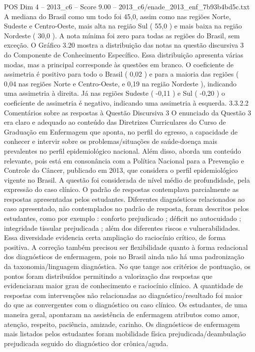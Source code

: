 \begin{textsample}{POS Dim 4 – 2013\_c6 – Score 9.00 – 2013\_c6/enade\_2013\_enf\_7b93b4bd5c.txt}
A mediana do Brasil como um todo foi 45,0, assim como nas regiões Norte, Sudeste e Centro-Oeste, mais alta na região Sul ( 55,0 ) e mais baixa na região Nordeste ( 30,0 ).
A nota mínima foi zero para todas as regiões do Brasil, sem exceção.
O Gráfico 3.20 mostra a distribuição das notas na questão discursiva 3 do Componente de Conhecimento Específico.
Essa distribuição apresenta várias modas, mas a principal corresponde às questões em branco.
O coeficiente de assimetria é positivo para todo o Brasil ( 0,02 ) e para a maioria das regiões ( 0,04 nas regiões Norte e Centro-Oeste, e 0,19 na região Nordeste ), indicando uma assimetria à direita.
Já nas regiões Sudeste ( -0,11 ) e Sul ( -0,20 ) o coeficiente de assimetria é negativo, indicando uma assimetria à esquerda. 3.3.2.2 Comentários sobre as respostas à Questão Discursiva 3 O enunciado da Questão 3 era claro e adequado ao conteúdo das Diretrizes Curriculares do Curso de Graduação em Enfermagem que aponta, no perfil do egresso, a capacidade de conhecer e intervir sobre os problemas/situações de saúde-doença mais prevalentes no perfil epidemiológico nacional.
Além disso, aborda um conteúdo relevante, pois está em consonância com a Política Nacional para a Prevenção e Controle do Câncer, publicado em 2013, que considera o perfil epidemiológico vigente no Brasil.
A questão foi considerada de nível médio de profundidade, pela expressão do caso clínico.
O padrão de respostas contemplava parcialmente as respostas apresentadas pelos estudantes.
Diferentes diagnósticos relacionados ao caso apresentado, não contemplados no padrão de resposta, foram descritos pelos estudantes, como por exemplo : conforto prejudicado ; déficit no autocuidado ; integridade tissular prejudicada ; além dos diferentes riscos e vulnerabilidades.
Essa diversidade evidencia certa ampliação do raciocínio crítico, de forma positiva.
A correção também precisou ser flexibilidade quanto à forma redacional dos diagnósticos de enfermagem, pois no Brasil ainda não há uma padronização da taxonomia/linguagem diagnóstica.
No que tange aos critérios de pontuação, os pontos foram distribuídos permitindo a valorização das respostas que evidenciaram maior grau de conhecimento e raciocínio clínico.
A quantidade de respostas com intervenções não relacionadas ao diagnóstico/resultado foi maior do que as convergentes com o diagnóstico ou caso clínico.
Os estudantes, de uma maneira geral, apontaram na assistência de enfermagem atributos como amor, atenção, respeito, paciência, amizade, carinho.
Os diagnósticos de enfermagem mais listados pelos estudantes foram mobilidade física prejudicada/deambulação prejudicada seguido do diagnóstico dor crônica/aguda.

\end{textsample}
